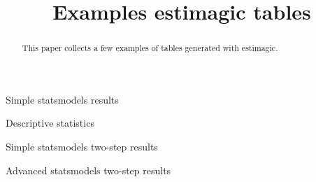 \documentclass[11pt, a4paper, leqno]{article}
\begin{document}
\title{Examples estimagic tables}


\maketitle


\begin{abstract}
    This paper collects a few examples of tables generated with estimagic.
\end{abstract}

\clearpage



\begin{table}[!h]
    \caption{Simple statsmodels results}
    
\end{table}

\begin{table}[!h]
    \caption{Descriptive statistics}
    
\end{table}

\begin{table}[!h]
    \caption{Simple statsmodels two-step results}
    
\end{table}


\begin{table}[!h]
    \caption{Advanced statsmodels two-step results}
    
\end{table}




\printbibliography
{}



\end{document}
